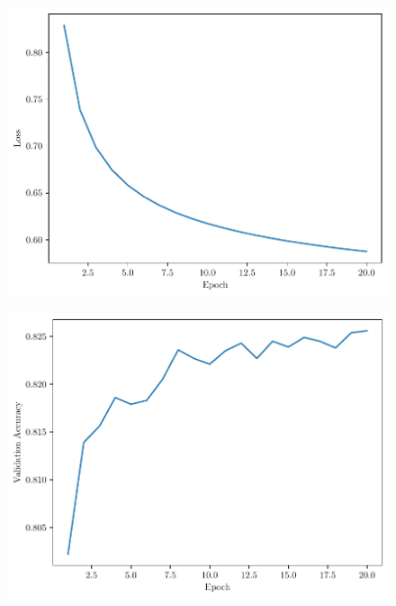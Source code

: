 \begin{questions}
        \begin{figure}[H]
            \centering
            \includegraphics[scale = 0.75]{logistic_regression-training-loss-0.001-sgd.pdf}
        \end{figure}

        \begin{figure}[H]
            \centering
            \includegraphics[scale = 0.75]{logistic_regression-validation-accuracy-0.001-sgd.pdf}
        \end{figure}


\end{questions}
